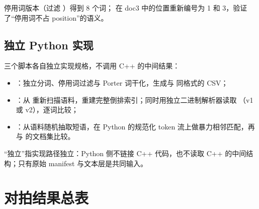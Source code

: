 停用词版本（过滤 ）得到 8 个词； 在 doc3 中的位置重新编号为 1 和 3，验证了“停用词不占 position”的语义。

\subsection{独立 Python 实现}

三个脚本各自独立实现规格，不调用 C++ 的中间结果：

\begin{itemize}
  \item {}：独立分词、停用词过滤与 Porter 词干化，生成与  同格式的 CSV；
  \item {}：从  重新扫描语料，重建完整倒排索引；同时用独立二进制解析器读取 （v1 或 v2），逐词比较；
  \item {}：从语料随机抽取短语，在 Python 的规范化 token 流上做暴力相邻匹配，再与  的文档集比较。
\end{itemize}

“独立”指实现路径独立：Python 侧不链接 C++ 代码，也不读取 C++ 的中间结构；只有原始 manifest 与文本层是共同输入。

\section{对拍结果总表}

